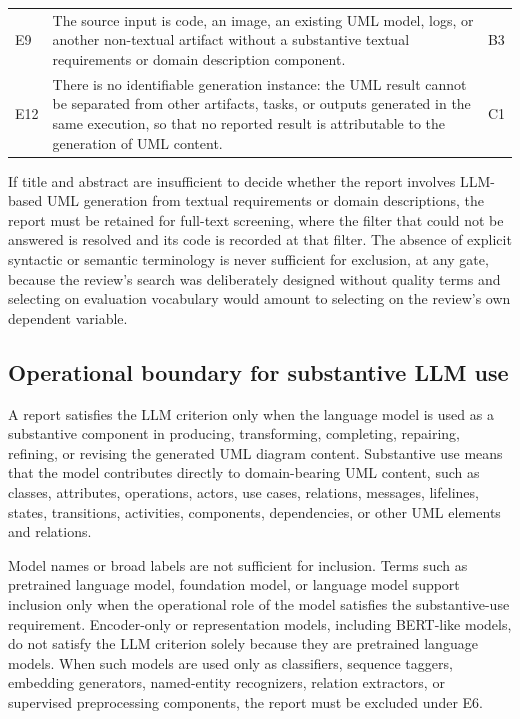 \begin{longtable}{p{} p{} p{}}
E9 & The source input is code, an image, an existing UML model, logs, or another non-textual artifact without a substantive textual requirements or domain description component. & B3 \\
E12 & There is no identifiable generation instance: the UML result cannot be separated from other artifacts, tasks, or outputs generated in the same execution, so that no reported result is attributable to the generation of UML content. & C1 \\
\bottomrule
\end{longtable}

If title and abstract are insufficient to decide whether the report involves LLM-based UML generation from textual requirements or domain descriptions, the report must be retained for full-text screening, where the filter that could not be answered is resolved and its code is recorded at that filter. The absence of explicit syntactic or semantic terminology is never sufficient for exclusion, at any gate, because the review's search was deliberately designed without quality terms and selecting on evaluation vocabulary would amount to selecting on the review's own dependent variable.

\subsection{Operational boundary for substantive LLM use}
\label{sec:substantive_llm_use_boundary}

A report satisfies the LLM criterion only when the language model is used as a substantive component in producing, transforming, completing, repairing, refining, or revising the generated UML diagram content. Substantive use means that the model contributes directly to domain-bearing UML content, such as classes, attributes, operations, actors, use cases, relations, messages, lifelines, states, transitions, activities, components, dependencies, or other UML elements and relations.

Model names or broad labels are not sufficient for inclusion. Terms such as pretrained language model, foundation model, or language model support inclusion only when the operational role of the model satisfies the substantive-use requirement. Encoder-only or representation models, including BERT-like models, do not satisfy the LLM criterion solely because they are pretrained language models. When such models are used only as classifiers, sequence taggers, embedding generators, named-entity recognizers, relation extractors, or supervised preprocessing components, the report must be excluded under E6.

